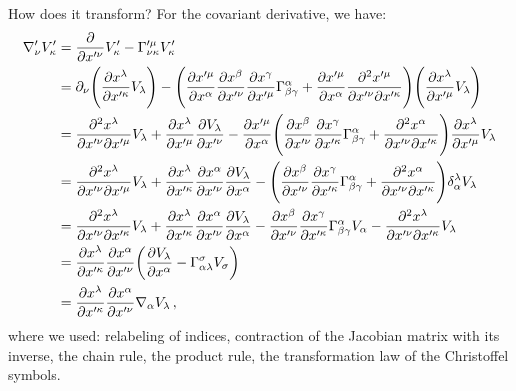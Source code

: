 \documentclass[main.tex]{subfiles}
\begin{document}
How does it transform? For the covariant derivative, we have:
%
\begin{subequations}
\begin{align}
  \nabla_{\nu }' V_{\kappa }' &= \pdv{}{x^{\prime \nu }} V'_\kappa - \Gamma^{\prime \mu }_{\nu \kappa } V_{\kappa }'  \\
  &= \partial_\nu \qty(\pdv{x^{\lambda }}{x^{\prime \kappa}}V_{\lambda }) -  \qty(\pdv{x^{\prime \mu }}{x^{\alpha }} \pdv{x^{\beta }}{x^{\prime \nu }} \pdv{x^{\gamma }}{x^{\prime \mu }} \Gamma^{\alpha }_{\beta \gamma } + 
  \pdv{x^{\prime \mu }}{x^{\alpha }} \pdv[2]{x^{\prime \mu }}{x^{\prime \nu }}{x^{\prime \kappa }} ) 
  \qty(\pdv{x^{\lambda }}{x^{\prime \mu }} V_{\lambda })  \\
  &= \pdv[2]{x^{\lambda }}{x^{\prime \nu }}{x^{\prime \mu }} V_{\lambda }
  + \pdv{x^{\lambda }}{x^{\prime \mu}} \pdv{V_{\lambda }}{x^{\prime \nu }} - 
  \pdv{x^{\prime \mu }}{x^{\alpha }} \qty(\pdv{x^{\beta }}{x^{\prime \nu }}\pdv{x^{\gamma }}{x^{\prime \kappa }} \Gamma^{\alpha }_{\beta \gamma }  + \pdv[2]{x^{\alpha }}{x^{\prime \nu }}{x^{\prime \kappa }} ) \pdv{x^{\lambda }}{x^{\prime \mu }} V_{\lambda }   \\
  &=\pdv[2]{x^{\lambda }}{x^{\prime \nu }}{x^{\prime \mu }} V_{\lambda }
  + \pdv{x^{\lambda }}{x^{\prime \kappa }} \pdv{x^{\alpha }}{x^{\prime \nu }} \pdv{V_{\lambda } }{x^{\alpha }}
  - \qty(\pdv{x^{\beta }}{x^{\prime \nu }}\pdv{x^{\gamma }}{x^{\prime \kappa }} \Gamma^{\alpha }_{\beta \gamma }  + \pdv[2]{x^{\alpha }}{x^{\prime \nu }}{x^{\prime \kappa }} ) \delta^{\lambda }_{\alpha }V_{\lambda }   \\
  &= \pdv[2]{x^{\lambda }}{x^{\prime \nu }}{x^{\prime \kappa }} V_{\lambda } 
  + \pdv{x^{\lambda }}{x^{\prime \kappa }} \pdv{x^{\alpha }}{x^{\prime \nu }} \pdv{V_{\lambda } }{x^{\alpha }}
  - \pdv{x^{\beta }}{x^{\prime \nu }} \pdv{x^{\gamma }}{x^{\prime \kappa }} \Gamma^{\alpha }_{\beta \gamma }V_{\alpha }
  -\pdv[2]{x^{\lambda }}{x^{\prime \nu }}{x^{\prime \kappa }} V_{\lambda }   \\
  &= \pdv{x^{\lambda }}{x^{\prime \kappa }} \pdv{x^{\alpha }}{x^{\prime \nu }}
  \qty(\pdv{V_{\lambda }}{x^{\alpha } } - \Gamma^{\sigma }_{\alpha \lambda }V_{\sigma })  \\
  &= \pdv{x^{\lambda }}{x^{\prime \kappa }} \pdv{x^{\alpha }}{x^{\prime \nu }}
  \nabla_{\alpha }V_{\lambda }
  \,,
\end{align}
\end{subequations}
%
where we used: relabeling of indices, contraction of the Jacobian matrix with its inverse, the chain rule, the product rule, the transformation law of the Christoffel symbols.
\end{document}
